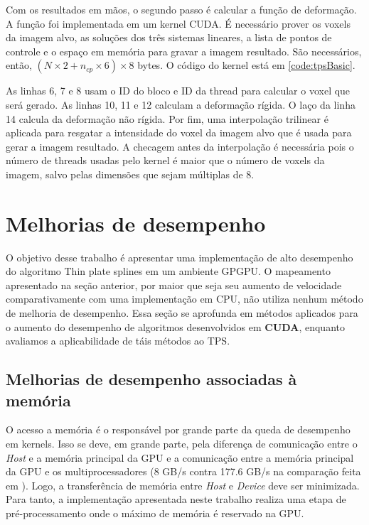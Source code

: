   Com os resultados em mãos, o segundo passo é calcular a função de deformação.
A função foi implementada em um kernel CUDA. É necessário prover os voxels da
imagem alvo, as soluções dos três sistemas lineares, a lista de pontos de controle
e o espaço em memória para gravar a imagem resultado. São necessários, então,
$(N \times 2 + n_{cp} \times 6) \times 8$ bytes. O código do kernel está em \ref{code:tpsBasic}.

  As linhas 6, 7 e 8 usam o ID do bloco e ID da thread para calcular o voxel que será
gerado. As linhas 10, 11 e 12 calculam a deformação rígida. O laço da linha 14
calcula da deformação não rígida. Por fim, uma interpolação trilinear é aplicada
para resgatar a intensidade do voxel da imagem alvo que é usada para gerar a imagem
resultado. A checagem antes da interpolação é necessária pois o número de threads
usadas pelo kernel é maior que o número de voxels da imagem, salvo pelas dimensões
que sejam múltiplas de 8.

\section{Melhorias de desempenho}\label{melhoriaDesempenho}

  O objetivo desse trabalho é apresentar uma implementação de alto desempenho
do algoritmo Thin plate splines em um ambiente GPGPU. O mapeamento apresentado
na seção anterior, por maior que seja seu aumento de velocidade comparativamente
com uma implementação em CPU, não utiliza nenhum método de melhoria de desempenho.
Essa seção se aprofunda em métodos aplicados para o aumento do desempenho de
algoritmos desenvolvidos em \textbf{CUDA}, enquanto avaliamos a aplicabilidade
de táis métodos ao TPS.

\subsection{Melhorias de desempenho associadas à memória}

O acesso a memória é o responsável por grande parte da queda de desempenho
em kernels. Isso se deve, em grande parte, pela diferença de comunicação entre o
\textit{Host} e a memória principal da GPU e a comunicação entre a memória
principal da GPU e os multiprocessadores
(8 GB/s contra 177.6 GB/s na comparação feita em \cite{cudaBestPractices}). Logo,
a transferência de memória entre \textit{Host} e \textit{Device} deve ser
minimizada. Para tanto, a implementação apresentada neste trabalho realiza uma
etapa de pré-processamento onde o máximo de memória é reservado na GPU.

